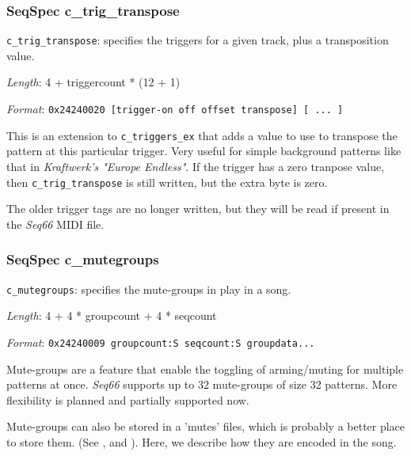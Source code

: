 \subsubsection{SeqSpec c\_trig\_transpose}
\label{subsubsec:midi_format_track_seqspec_trig_transpose}

   \begin{description}
      \item \texttt{c\_trig\_transpose}: specifies the triggers for a given track,
         plus a transposition value.
      \item \textsl{Length}: 4 + triggercount * (12 + 1)
      \item \textsl{Format}: \texttt{0x24240020 [trigger-on off offset transpose]
         [ ... ]}
   \end{description}

   This is an extension to \texttt{c\_triggers\_ex} that adds a value to use to
   transpose the pattern at this particular trigger.
   Very useful for simple background patterns like that in
   \textsl{Kraftwerk's "Europe Endless"}.
   If the trigger has a zero tranpose value, then 
   \texttt{c\_trig\_transpose} is still written, but the extra byte is zero.

   The older trigger tags are no longer written, but they will be read if
   present in the \textsl{Seq66} MIDI file.

\subsubsection{SeqSpec c\_mutegroups}
\label{subsubsec:midi_format_track_seqspec_mutegroups}

   \begin{description}
      \item \texttt{c\_mutegroups}: specifies the mute-groups in play in a song.
      \item \textsl{Length}: 4 + 4 * groupcount + 4 * seqcount
      \item \textsl{Format}: \texttt{0x24240009 groupcount:S seqcount:S groupdata...}
   \end{description}

   Mute-groups are a feature that enable the toggling of arming/muting for
   multiple patterns at once.  \textsl{Seq66} supports up to 32 mute-groups of
   size 32 patterns.  More flexibility is planned and partially supported now.

   Mute-groups can also be stored in a 'mutes' files, which is probably a better
   place to store them.
   (See , and
   ).
   Here, we describe how they are encoded in the song.

